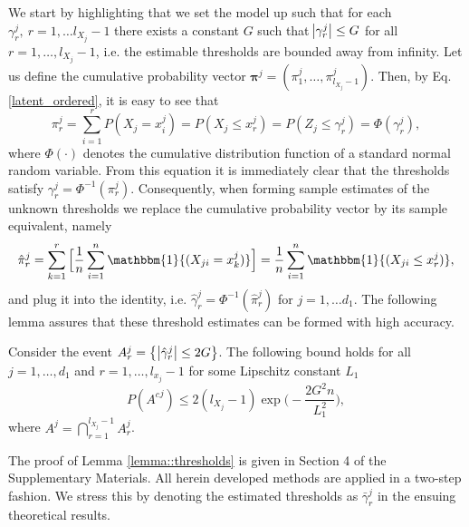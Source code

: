 We start by highlighting that we set the model up such that for each $\gamma_r^j, \ r = 1, \dots l_{X_j}-1$ there exists a constant $G$ such that $\abs{\gamma_r^j} \leq G$ for all $r = 1, \dots, l_{X_j}-1$, i.e. the estimable thresholds are bounded away from infinity. Let us define the cumulative probability vector $\mathbf{\pi}^j = (\pi_1^j, \dots, \pi_{l_{X_j}-1}^j)$. Then, by Eq. \eqref{latent_ordered}, it is easy to see that 
\begin{equation*}\label{thresholds_identity}
    \pi_r^j = \sum_{i=1}^r P(X_j = x_i^j)  = P(X_j \leq x_r^j) = P(Z_j \leq \gamma^j_r) = \Phi(\gamma_r^j), 
\end{equation*}
where $\Phi(\cdot)$ denotes the cumulative distribution function of a standard normal random variable. From this equation it is immediately clear that the thresholds satisfy $\gamma_r^j = \Phi^{-1}( \pi_r^j )$. Consequently, when forming sample estimates of the unknown thresholds we replace the cumulative probability vector by its sample equivalent, namely
\begin{equation*}
    \hat\pi_r^j = \sum_{k=1}^r \Big[\frac{1}{n} \sum_{i=1}^n \mathbbm{1}{(X_{ji} = x_k^j)}\Big] = \frac{1}{n} \sum_{i=1}^n \mathbbm{1}{(X_{ji} \leq x_r^j)},
\end{equation*}
and plug it into the identity, i.e. $\hat\gamma_r^j = \Phi^{-1}\left( \hat\pi_r^j \right)$ for $j = 1, \dots d_1$. The following lemma assures that these threshold estimates can be formed with high accuracy.
\begin{lemma}\label{lemma::thresholds}
    Consider the event $A_r^j = \big\{\abs{\hat{\gamma}^j_r} \leq 2G\big\}$. The following bound holds for all $j = 1, \dots, d_1$ and $r = 1, \dots, l_{x_j}-1$ for some Lipschitz constant $L_1$
    \begin{equation*}
        P\left({A^c}^j\right) \leq 2(l_{X_j}-1)\exp{\Big(- \frac{2G^2n}{L_1^2}\Big)},
    \end{equation*}
    where $A^j = \bigcap_{r=1}^{l_{X_j}-1} A_r^j$.
\end{lemma}

The proof of Lemma \ref{lemma::thresholds} is given in Section 4 %
of the Supplementary Materials. All herein developed methods are applied in a two-step fashion. 
We stress this by denoting the estimated thresholds as $\bar{\gamma}^j_r$ in the ensuing theoretical results.    

